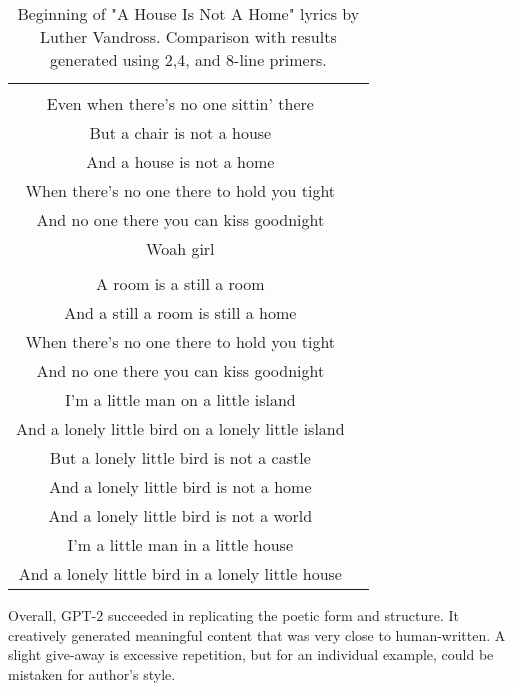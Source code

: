 \begin{table}[!h]
\begin{tabular}{cc}
\begin{minipage}[t]{0.47\textwidth}
	 A chair is still a chair\\
	 Even when there's no one sittin' there\\
	 But a chair is not a house\\
	 And a house is not a home\\
	 When there's no one there to hold you tight\\
	 And no one there you can kiss goodnight\\
	 Woah girl\\
	 \\
	 A room is a still a room\\
	 \color{blue} And a still a room is still a home\\
	 When there's no one there to hold you tight\\
	 And no one there you can kiss goodnight\\
	 I'm a little man on a little island\\
	 And a lonely little bird on a lonely little island\\	 
	 But a lonely little bird is not a castle\\
	 And a lonely little bird is not a home\\
	 And a lonely little bird is not a world\\
	 I'm a little man in a little house\\
	 And a lonely little bird in a lonely little house
	 \end{minipage}\\[6pt]
	\end{tabular}
	\caption{Beginning of "A House Is Not A Home" lyrics by Luther Vandross. Comparison with results generated using 2,4, and 8-line primers.}
	\label{generation_result}
\end{table}


Overall, GPT-2 succeeded in replicating the poetic form and structure. It creatively generated meaningful content that was very close to human-written. A slight give-away is excessive repetition, but for an individual example, could be mistaken for author's style.

